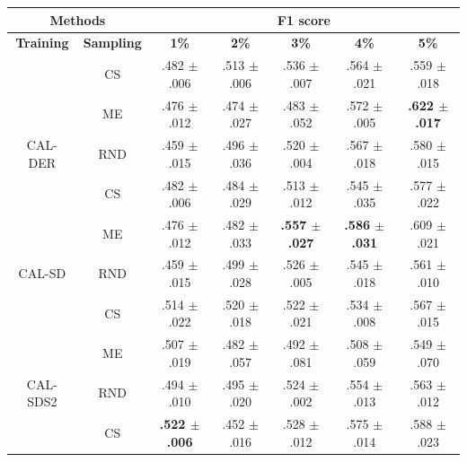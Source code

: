 \begin{table}[htbp]
\centering

\begin{tabular*}{\linewidth}{c|c|@{\extracolsep{\fill}}ccccc}
\toprule
\multicolumn{2}{c|}{\textbf{Methods}} & \multicolumn{5}{c}{\textbf{F1 score}} \\
\midrule
\textbf{Training} & \textbf{Sampling} & \textbf{1\%} & \textbf{2\%} & \textbf{3\%} & \textbf{4\%} & \textbf{5\%}\\
\midrule
 & CS & .482 $\pm$ {\small .006} & .513 $\pm$ {\small .006} & .536 $\pm$ {\small .007} & .564 $\pm$ {\small .021} & .559 $\pm$ {\small .018}\\

 & ME & .476 $\pm$ {\small .012} & .474 $\pm$ {\small .027} & .483 $\pm$ {\small .052} & .572 $\pm$ {\small .005} & \textbf{.622 $\pm$ {\small .017}}\\

\multirow{-3}{*}{\raggedright\arraybackslash CAL-DER} & RND & .459 $\pm$ {\small .015} & .496 $\pm$ {\small .036} & .520 $\pm$ {\small .004} & .567 $\pm$ {\small .018} & .580 $\pm$ {\small .015}\\
\midrule
 & CS & .482 $\pm$ {\small .006} & .484 $\pm$ {\small .029} & .513 $\pm$ {\small .012} & .545 $\pm$ {\small .035} & .577 $\pm$ {\small .022}\\

 & ME & .476 $\pm$ {\small .012} & .482 $\pm$ {\small .033} & \textbf{.557 $\pm$ {\small .027}} & \textbf{.586 $\pm$ {\small .031}} & .609 $\pm$ {\small .021}\\

\multirow{-3}{*}{\raggedright\arraybackslash CAL-SD} & RND & .459 $\pm$ {\small .015} & .499 $\pm$ {\small .028} & .526 $\pm$ {\small .005} & .545 $\pm$ {\small .018} & .561 $\pm$ {\small .010}\\
\midrule
 & CS & .514 $\pm$ {\small .022} & .520 $\pm$ {\small .018} & .522 $\pm$ {\small .021} & .534 $\pm$ {\small .008} & .567 $\pm$ {\small .015}\\

 & ME & .507 $\pm$ {\small .019} & .482 $\pm$ {\small .057} & .492 $\pm$ {\small .081} & .508 $\pm$ {\small .059} & .549 $\pm$ {\small .070}\\

\multirow{-3}{*}{\raggedright\arraybackslash CAL-SDS2} & RND & .494 $\pm$ {\small .010} & .495 $\pm$ {\small .020} & .524 $\pm$ {\small .002} & .554 $\pm$ {\small .013} & .563 $\pm$ {\small .012}\\
\midrule
 & CS & \textbf{.522 $\pm$ {\small .006}} & .452 $\pm$ {\small .016} & .528 $\pm$ {\small .012} & .575 $\pm$ {\small .014} & .588 $\pm$ {\small .023}\\


\end{tabular*}
\end{table}
